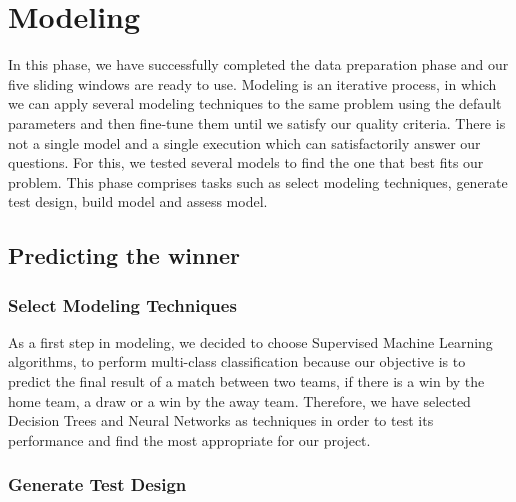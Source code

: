 \chapter{Modeling}
\label{cha:Modelling}

In this phase, we have successfully completed the data preparation phase and our five sliding windows are ready to use. \newline \newline
Modeling is an iterative process, in which we can apply several modeling techniques to the same problem using the default parameters and then fine-tune them until we satisfy our quality criteria. There is not a single model and a single execution which can satisfactorily answer our questions. For this, we tested several models to find the one that best fits our problem.\newline \newline
This phase comprises tasks such as select modeling techniques, generate test design, build model and assess model.

\section{Predicting the winner}
\subsection{Select Modeling Techniques}

As a first step in modeling, we decided to choose Supervised Machine Learning algorithms, to perform multi-class classification because our objective is to predict the final result of a match between two teams, if there is a win by the home team, a draw or a win by the away team. \newline \newline
Therefore, we have selected Decision Trees and Neural Networks as techniques in order to test its performance and find the most appropriate for our project.

\subsection{Generate Test Design}

